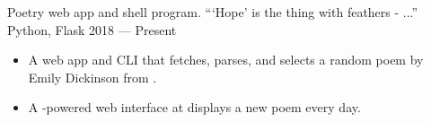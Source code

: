 \showoff
{}
{Poetry web app and shell program. ```Hope' is the thing with feathers - ...''}
{Python, Flask}
{2018 --- Present}

\begin{itemize}[label=$\triangleright$]
    \item A web app and CLI that fetches, parses, and selects a random poem by Emily Dickinson from .
    \item A -powered web interface at  displays a new poem every day.
\end{itemize}
